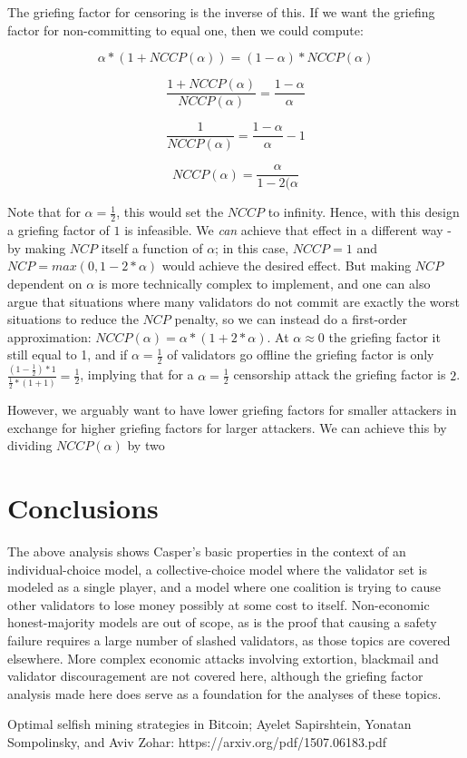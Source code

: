 \documentclass[12pt]{article}
\begin{document}
The griefing factor for censoring is the inverse of this. If we want the griefing factor for non-committing to equal one, then we could compute:

$$\alpha * (1 + NCCP(\alpha)) = (1-\alpha) * NCCP(\alpha)$$

$$\frac{1 + NCCP(\alpha)}{NCCP(\alpha)} = \frac{1-\alpha}{\alpha}$$

$$\frac{1}{NCCP(\alpha)} = \frac{1-\alpha}{\alpha} - 1$$

$$NCCP(\alpha) = \frac{\alpha}{1-2(\alpha}$$

Note that for $\alpha = \frac{1}{2}$, this would set the $NCCP$ to infinity. Hence, with this design a griefing factor of $1$ is infeasible. We \textit{can} achieve that effect in a different way - by making $NCP$ itself a function of $\alpha$; in this case, $NCCP = 1$ and $NCP = max(0, 1 - 2 * \alpha)$ would achieve the desired effect. But making $NCP$ dependent on $\alpha$ is more technically complex to implement, and one can also argue that situations where many validators do not commit are exactly the worst situations to reduce the $NCP$ penalty, so we can instead do a first-order approximation: $NCCP(\alpha) = \alpha * (1 + 2*\alpha)$. At $\alpha \approx 0$ the griefing factor it still equal to 1, and if $\alpha = \frac{1}{2}$ of validators go offline the griefing factor is only $\frac{(1-\frac{1}{2}) * 1}{\frac{1}{2} * (1 + 1)} = \frac{1}{2}$, implying that for a $\alpha = \frac{1}{2}$ censorship attack the griefing factor is $2$.

However, we arguably want to have lower griefing factors for smaller attackers in exchange for higher griefing factors for larger attackers. We can achieve this by dividing $NCCP(\alpha)$ by two

\section{Conclusions}

The above analysis shows Casper's basic properties in the context of an individual-choice model, a collective-choice model where the validator set is modeled as a single player, and a model where one coalition is trying to cause other validators to lose money possibly at some cost to itself. Non-economic honest-majority models are out of scope, as is the proof that causing a safety failure requires a large number of slashed validators, as those topics are covered elsewhere. More complex economic attacks involving extortion, blackmail and validator discouragement are not covered here, although the griefing factor analysis made here does serve as a foundation for the analyses of these topics.



Optimal selfish mining strategies in Bitcoin; Ayelet Sapirshtein, Yonatan Sompolinsky, and Aviv Zohar: https://arxiv.org/pdf/1507.06183.pdf
\end{document}
